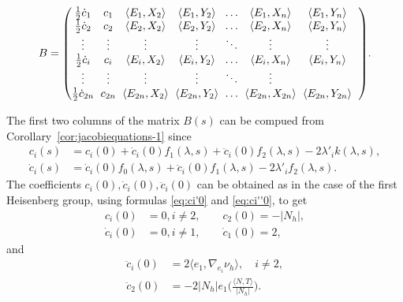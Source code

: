 \documentclass[10pt]{amsart}
\theoremstyle{definition}
\theoremstyle{remark}
\numberwithin{equation}{section}
\begin{document}
\begin{equation}
\label{eq:matrix-2}
B={\setlength{\arraycolsep}{3pt}\begin{pmatrix}
\tfrac{1}{2}\dot{c}_1 & c_1 & {\langle{E_1,X_2}\rangle}  & {\langle{E_1,Y_2}\rangle} &\ldots  & {\langle{E_1,X_n}\rangle} & {\langle{E_1,Y_n}\rangle}
\\
\tfrac{1}{2}\dot{c}_2 & c_2 & {\langle{E_2,X_2}\rangle}  & {\langle{E_2,Y_2}\rangle} &\ldots  & {\langle{E_2,X_n}\rangle} & {\langle{E_2,Y_n}\rangle}
\\
\vdots & \vdots & \vdots& \vdots & \ddots & \vdots & \vdots &
\\
\tfrac{1}{2}\dot{c}_i & c_i & {\langle{E_i,X_2}\rangle}  & {\langle{E_i,Y_2}\rangle} & \ldots  & {\langle{E_i,X_n}\rangle} & {\langle{E_i,Y_n}\rangle}
\\
\vdots & \vdots &  \vdots & \vdots & \ddots & \vdots 
\\
\tfrac{1}{2}\dot{c}_{2n} & c_{2n} & {\langle{E_{2n},X_2}\rangle}  & {\langle{E_{2n},Y_2}\rangle} & \ldots  & {\langle{E_{2n},X_{2n}}\rangle} & {\langle{E_{2n},Y_{2n}}\rangle}
\end{pmatrix}}.
\end{equation}

The first two columns of the matrix $B(s)$ can be compued from Corollary~\ref{cor:jacobiequations-1} since
\begin{align*}
c_i(s)&=c_i(0)+\dot{c}_i(0)f_1({\lambda}, s)+\ddot{c}_i(0)f_2({\lambda}, s)-2{\lambda}'_ik({\lambda}, s),
\\
\dot{c}_i(s)&=\dot{c}_i(0)f_0({\lambda},s)+\ddot{c}_i(0)f_1({\lambda},s)-2{\lambda}'_i f_2({\lambda},s).
\end{align*}
The coefficients $c_i(0),\dot{c}_i(0),\ddot{c}_i(0)$ can be obtained as in the case of the first Heisenberg group, using formulas \eqref{eq:ci'0} and \eqref{eq:ci''0}, to get
\begin{align*}
c_i(0)&=0, i\neq 2, \qquad c_2(0)=-{|N_{h}|},
\\
\dot{c}_i(0)&=0, i\neq 1, \qquad \dot{c}_1(0)=2,
\end{align*}
and
\begin{align*}
\ddot{c}_i(0)&=2{\langle{e_1,\nabla_{e_i}{\nu_{h}}}\rangle},\quad i\neq 2,
\\
\ddot{c}_2(0)&=-2{|N_{h}|} e_1\big(\tfrac{{\langle{N,T}\rangle}}{|N_{h}|}\big).
\end{align*}
\end{document}
